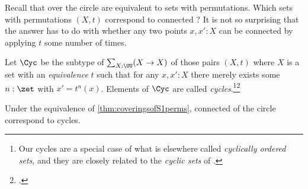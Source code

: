 Recall that \coverings over the circle are equivalent to sets with permutations.
Which sets with permutations $(X,t)$ correspond to connected \coverings?
It is not so surprising that the answer has to do with whether
any two points $x,x':X$ can be connected by applying $t$ some number of times.
\begin{definition}\label{def:Cyc}
  Let $\Cyc$ be the subtype of $\sum_{X:\UU}(X\to X)$ of those
  pairs $(X,t)$ where $X$ is a \emph{\nonempty} set with an \emph{equivalence} $t$
  such that for any $x,x':X$
  there merely exists some $n:\zet$ with $x' = t^n(x)$.
  Elements of $\Cyc$ are called \emph{cycles}.\footnote{%
    Our cycles are a special case of what is elsewhere called
    \emph{cyclically ordered sets},
    and they are closely related to the \emph{cyclic sets} of
    \citeauthor{Connes1983}\footnotemark{}.}\footcitetext{Connes1983}
\end{definition}
\begin{theorem}\label{thm:cycset-connS1cover}
  Under the equivalence of \cref{thm:coveringsofS1perms},
  connected \coverings of the circle correspond to cycles.
\end{theorem}
